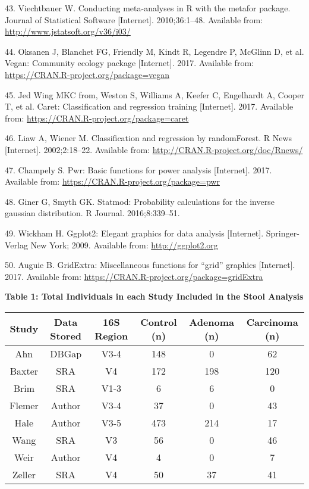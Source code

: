 \documentclass[12pt,]{article}
\begin{document}
\hypertarget{ref-metafor_citation_2010}{}
43. Viechtbauer W. Conducting meta-analyses in R with the metafor
package. Journal of Statistical Software {[}Internet{]}. 2010;36:1--48.
Available from: \url{http://www.jstatsoft.org/v36/i03/}

\hypertarget{ref-vegan_citation_2017}{}
44. Oksanen J, Blanchet FG, Friendly M, Kindt R, Legendre P, McGlinn D,
et al. Vegan: Community ecology package {[}Internet{]}. 2017. Available
from: \url{https://CRAN.R-project.org/package=vegan}

\hypertarget{ref-caret_citation_2017}{}
45. Jed Wing MKC from, Weston S, Williams A, Keefer C, Engelhardt A,
Cooper T, et al. Caret: Classification and regression training
{[}Internet{]}. 2017. Available from:
\url{https://CRAN.R-project.org/package=caret}

\hypertarget{ref-randomforest_citation_2002}{}
46. Liaw A, Wiener M. Classification and regression by randomForest. R
News {[}Internet{]}. 2002;2:18--22. Available from:
\url{http://CRAN.R-project.org/doc/Rnews/}

\hypertarget{ref-pwr_citation_2017}{}
47. Champely S. Pwr: Basic functions for power analysis {[}Internet{]}.
2017. Available from: \url{https://CRAN.R-project.org/package=pwr}

\hypertarget{ref-statmod_citation_2016}{}
48. Giner G, Smyth GK. Statmod: Probability calculations for the inverse
gaussian distribution. R Journal. 2016;8:339--51.

\hypertarget{ref-ggplot2_citation_2009}{}
49. Wickham H. Ggplot2: Elegant graphics for data analysis
{[}Internet{]}. Springer-Verlag New York; 2009. Available from:
\url{http://ggplot2.org}

\hypertarget{ref-gridextra_citation_2017}{}
50. Auguie B. GridExtra: Miscellaneous functions for ``grid'' graphics
{[}Internet{]}. 2017. Available from:
\url{https://CRAN.R-project.org/package=gridExtra}

\newpage

\textbf{Table 1: Total Individuals in each Study Included in the Stool
Analysis}

\footnotesize

\begin{longtable}[]{@{}cccccc@{}}
\toprule
Study & Data Stored & 16S Region & Control (n) & Adenoma (n) & Carcinoma
(n)\tabularnewline
\midrule
\endhead
Ahn & DBGap & V3-4 & 148 & 0 & 62\tabularnewline
Baxter & SRA & V4 & 172 & 198 & 120\tabularnewline
Brim & SRA & V1-3 & 6 & 6 & 0\tabularnewline
Flemer & Author & V3-4 & 37 & 0 & 43\tabularnewline
Hale & Author & V3-5 & 473 & 214 & 17\tabularnewline
Wang & SRA & V3 & 56 & 0 & 46\tabularnewline
Weir & Author & V4 & 4 & 0 & 7\tabularnewline
Zeller & SRA & V4 & 50 & 37 & 41\tabularnewline
\bottomrule
\end{longtable}
\end{document}
